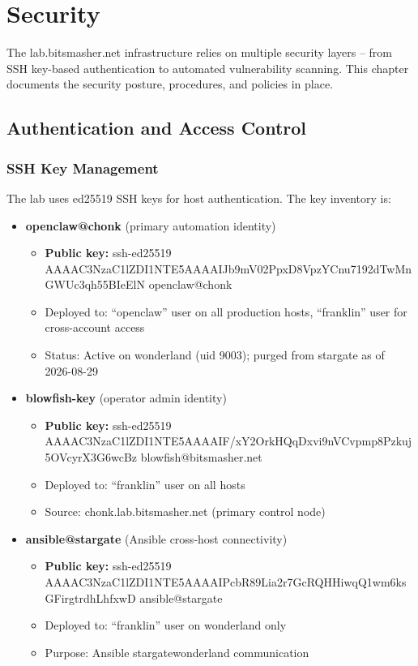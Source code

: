 
\chapter{Security}
\label{ch:security}

The lab.bitsmasher.net infrastructure relies on multiple security layers -- from SSH key-based authentication to automated vulnerability scanning. This chapter documents the security posture, procedures, and policies in place.

\section{Authentication and Access Control}

\subsection{SSH Key Management}
The lab uses ed25519 SSH keys for host authentication. The key inventory is:

\begin{itemize}
  \item \textbf{openclaw@chonk} (primary automation identity)
    \begin{itemize}
      \item \textbf{Public key:} ssh-ed25519 AAAAC3NzaC1lZDI1NTE5AAAAIJb9mV02PpxD8VpzYCnu7192dTwMnGWUc3qh55BIeElN openclaw@chonk
      \item Deployed to: ``openclaw'' user on all production hosts, ``franklin'' user for cross-account access
      \item Status: Active on wonderland (uid 9003); purged from stargate as of 2026-08-29
    \end{itemize}

  \item \textbf{blowfish-key} (operator admin identity)
    \begin{itemize}
      \item \textbf{Public key:} ssh-ed25519 AAAAC3NzaC1lZDI1NTE5AAAAIF/xY2OrkHQqDxvi9nVCvpmp8Pzkuj5OVcyrX3G6wcBz blowfish@bitsmasher.net
      \item Deployed to: ``franklin'' user on all hosts
      \item Source: chonk.lab.bitsmasher.net (primary control node)
    \end{itemize}

  \item \textbf{ansible@stargate} (Ansible cross-host connectivity)
    \begin{itemize}
      \item \textbf{Public key:} ssh-ed25519 AAAAC3NzaC1lZDI1NTE5AAAAIPcbR89Lia2r7GcRQHHiwqQ1wm6ksGFirgtrdhLhfxwD ansible@stargate
      \item Deployed to: ``franklin'' user on wonderland only
      \item Purpose: Ansible stargate\textbar{}\textbar{}wonderland communication
    \end{itemize}
\end{itemize}

